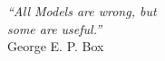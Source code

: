 \cleardoublepage
\thispagestyle{plain}

\vspace*{8cm}

\begin{flushright}
   \textsl{``All Models are wrong, but \\
           some are useful.''} \\
\vspace*{1.5cm}
           George E. P. Box
\end{flushright}
